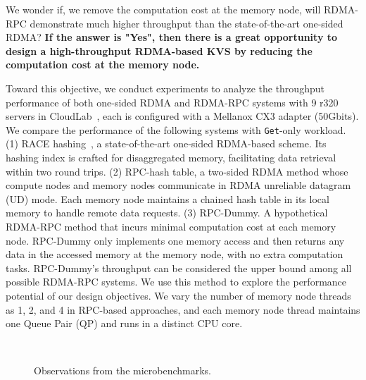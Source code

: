 We wonder if, we remove the computation cost at the memory node, will RDMA-RPC demonstrate much higher throughput than the state-of-the-art one-sided RDMA?
\textbf{If the answer is "Yes", then there is a great opportunity to design a high-throughput RDMA-based KVS by reducing the computation cost at the memory node.} 

Toward this objective, we conduct experiments to analyze the throughput performance of both one-sided RDMA and RDMA-RPC systems with 9 r320 servers in CloudLab~\cite{cloudlab}, each is configured with a Mellanox CX3 adapter (50Gbits).
We compare the performance of the following systems with \texttt{Get}-only workload. (1) RACE hashing~\cite{race}, a state-of-the-art one-sided RDMA-based scheme. Its hashing index is crafted for disaggregated memory, facilitating data retrieval within two round trips. (2) RPC-hash table, a two-sided RDMA method whose compute nodes and memory nodes communicate in RDMA unreliable datagram (UD) mode. Each memory node maintains a chained hash table in its local memory to handle remote data requests. (3) RPC-Dummy. A hypothetical RDMA-RPC method that incurs minimal computation cost at each memory node. 
RPC-Dummy only implements one memory access and then returns any data in the accessed memory at the memory node,  with no extra computation tasks.
RPC-Dummy's throughput can be considered the upper bound among all possible RDMA-RPC systems. We use this method to explore the performance potential of our design objectives.  We vary the number of memory node threads as 1, 2, and 4 in RPC-based approaches, and each memory node thread maintains one Queue Pair (QP) and runs in a distinct CPU core.

\begin{figure}[!t]
\centering
\captionsetup[subfigure]{aboveskip=-2ex}
\vspace{-2ex}
\hspace{-2.5ex}
\\
\vspace{-3ex}
\hspace{-2.2ex}
\vspace{-3ex}
\caption{Observations from the microbenchmarks.}
\label{fig:motivation}
\vspace{-4.5ex}
\end{figure}

